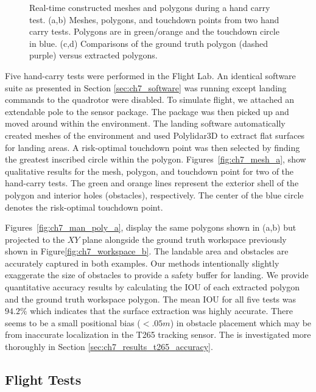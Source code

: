 \begin{figure}[!htb]
\begin{subfigure}[t]{.33\linewidth}
    \caption{\label{fig:ch7_man_poly_b}}
  \end{subfigure}
   \caption[Real-time constructed meshes and polygons during hand carry test]{Real-time constructed meshes and polygons during a hand carry test. (a,b) Meshes, polygons, and touchdown points from two hand carry tests. Polygons are in green/orange and the touchdown circle in blue. (c,d) Comparisons of the ground truth polygon (dashed purple) versus extracted polygons.} \label{fig:ch7_mesh_handcarry}
\end{figure}


Five hand-carry tests were performed in the Flight Lab. An identical software suite as presented in Section \ref{sec:ch7_software} was running except landing commands to the quadrotor were disabled. To simulate flight, we attached an extendable pole to the sensor package.  The package was then picked up and moved around within the environment. The landing software automatically created meshes of the environment and used Polylidar3D to extract flat surfaces for landing areas.  A risk-optimal touchdown point was then selected by finding the greatest inscribed circle within the polygon. Figures~\ref{fig:ch7_mesh_a}, show qualitative results for the mesh, polygon, and touchdown point for two of the hand-carry tests. The green and orange lines represent the exterior shell of the polygon and interior holes (obstacles), respectively. The center of the blue circle denotes the risk-optimal touchdown point. 

Figures~\ref{fig:ch7_man_poly_a}, display the same polygons shown in (a,b) but projected to the $XY$ plane alongside the ground truth workspace previously shown in Figure\ref{fig:ch7_workspace_b}. The landable area and obstacles are accurately captured in both examples. Our methods intentionally slightly exaggerate the size of obstacles to provide a safety buffer for landing.  We provide quantitative accuracy results by calculating the \ac{IOU} of each extracted polygon and the ground truth workspace polygon.  The mean \ac{IOU} for all five tests was $94.2\%$ which indicates that the surface extraction was highly accurate. There seems to be a small positional bias ($< .05m$) in obstacle placement which may be from inaccurate localization in the T265 tracking sensor. The is investigated more thoroughly in Section \ref{sec:ch7_results_t265_accuracy}.


\subsection{Flight Tests} \label{sec:ch7_results_flight}


